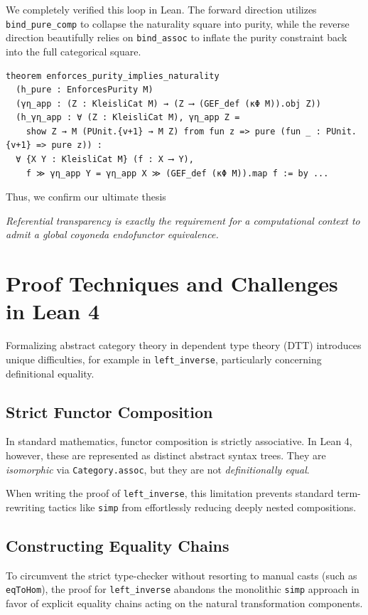 \documentclass{article}
\begin{document}
We completely verified this loop in Lean. The forward direction utilizes \texttt{bind\_pure\_comp}
to collapse the naturality square into purity, while the reverse direction beautifully relies on
\texttt{bind\_assoc} to inflate the purity constraint back into the full categorical square.

\vspace{6pt}
\begin{lstlisting}[basicstyle=\tiny]
theorem enforces_purity_implies_naturality
  (h_pure : EnforcesPurity M)
  (γη_app : (Z : KleisliCat M) → (Z ⟶ (GEF_def (κΦ M)).obj Z))
  (h_γη_app : ∀ (Z : KleisliCat M), γη_app Z = 
    show Z → M (PUnit.{v+1} → M Z) from fun z => pure (fun _ : PUnit.{v+1} => pure z)) :
  ∀ {X Y : KleisliCat M} (f : X ⟶ Y),
    f ≫ γη_app Y = γη_app X ≫ (GEF_def (κΦ M)).map f := by ...
\end{lstlisting}
\vspace{6pt}

Thus, we confirm our ultimate thesis

\vspace{12pt}

\emph{Referential transparency is exactly the requirement for a computational context to admit a
global coyoneda endofunctor equivalence.}


\section{Proof Techniques and Challenges in Lean 4}

Formalizing abstract category theory in dependent type theory (DTT) introduces unique
difficulties, for example in \texttt{left\_inverse}, particularly concerning definitional
equality. 

\subsection{Strict Functor Composition}
In standard mathematics, functor composition is strictly associative. In Lean 4, however, these are
represented as distinct abstract syntax trees. They are \emph{isomorphic} via 
\texttt{Category.assoc}, but they are not \emph{definitionally equal}. 

When writing the proof of \texttt{left\_inverse}, this limitation prevents standard
term-rewriting tactics like \texttt{simp} from effortlessly reducing deeply nested compositions.

\subsection{Constructing Equality Chains}
To circumvent the strict type-checker without resorting to manual casts (such as \texttt{eqToHom}),
the proof for \texttt{left\_inverse} abandons the monolithic \texttt{simp} approach in favor of
explicit equality chains acting on the natural transformation components.
\end{document}
